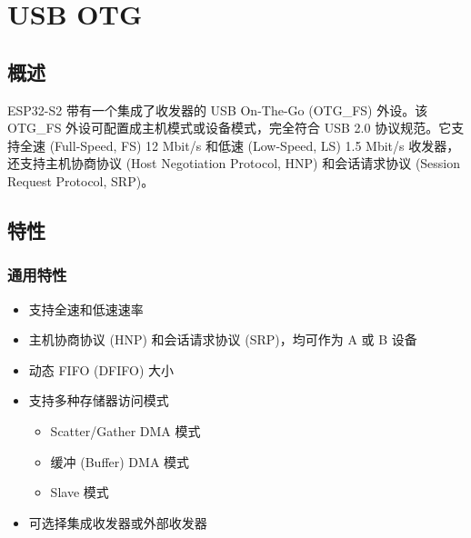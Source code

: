 \documentclass[main\_\_CN.tex]{subfiles}
\begin{document}
\setchineseformatting

\ifglobal
\else
    {\let\clearpage\relax \listoftodos}
    \tableofcontents
\fi




\hypertarget{usbotg}{}
\chapter{USB OTG}
\label{mod:usbotg}

\section{概述}
ESP32-S2 带有一个集成了收发器的 USB On-The-Go (OTG\_FS) 外设。该 OTG\_FS 外设可配置成主机模式或设备模式，完全符合 USB 2.0 协议规范。它支持全速 (Full-Speed, FS) 12 Mbit/s 和低速 (Low-Speed, LS) 1.5 Mbit/s 收发器，还支持主机协商协议 (Host Negotiation Protocol, HNP) 和会话请求协议 (Session Request Protocol, SRP)。

\section{特性}

\subsection{通用特性}
\begin{itemize}
    \item 支持全速和低速速率
    \item 主机协商协议 (HNP) 和会话请求协议 (SRP)，均可作为 A 或 B 设备
    \item 动态 FIFO (DFIFO) 大小
    \item 支持多种存储器访问模式
    \begin{itemize}
        \item Scatter/Gather DMA 模式
        \item 缓冲 (Buffer) DMA 模式
        \item Slave 模式
    \end{itemize}
    \item 可选择集成收发器或外部收发器
\end{itemize}
\end{document}
